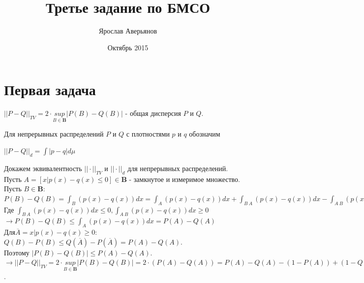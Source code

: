 \documentclass{article}
\title{Третье задание по БМСО}
\author{Ярослав Аверьянов}
\date{Октябрь 2015}
\begin{document}
\maketitle

\section{Первая задача}
\begin{center} 
$||P - Q||_{TV} = 2\cdot \underset{B \in \mathbf{B}}{sup}|P(B) - Q(B)|$ - общая дисперсия $P$ и $Q$.
\end{center}
Для непрерывных распределений $P$ и $Q$ с плотностями $p$ и $q$ обозначим
\begin{center}
$||P - Q||_d = \int |p - q|d\mu$
\end{center}
Докажем эквивалентность $||\cdot||_{TV}$ и $||\cdot||_d$ для непрерывных распределений.\\
Пусть $A = [x|p(x) - q(x) \leq 0] \in \mathbf{B}$ - замкнутое и измеримое множество.\\
Пусть $B \in \mathbf{B}$:\\
$P(B) - Q(B) = \int_{B} (p(x) - q(x))dx = \int_A (p(x) - q(x))dx + \int_{B \ A} (p(x) - q(x))dx - \int_{A \ B} (p(x) - q(x))dx$\\
Где $\int_{B \ A} (p(x) - q(x))dx \leq 0, \int_{A \ B} (p(x) - q(x))dx \geq 0$
$\to P(B) - Q(B) \leq \int_A (p(x) - q(x))dx = P(A) - Q(A)$\\
$Для \overline{A} = {x|p(x) - q(x) \geq 0}$:\\
$Q(B) - P(B) \leq Q(\overline{A}) - P(\overline{A}) = P(A) - Q(A)$.\\
Поэтому $|P(B) - Q(B)| \leq P(A) - Q(A)$.
$\to ||P - Q||_{TV} = 2\cdot \underset{B \in \mathbf{B}}{sup}|P(B) - Q(B)| = 2\cdot(P(A) - Q(A)) = P(A) - Q(A) - (1 - P(A)) + (1 - Q(A)) = \int_A (p - q)d\mu + \int_{\overline{A}} (p - q)d\mu = ||p - q||_{d}$.
\end{document}
